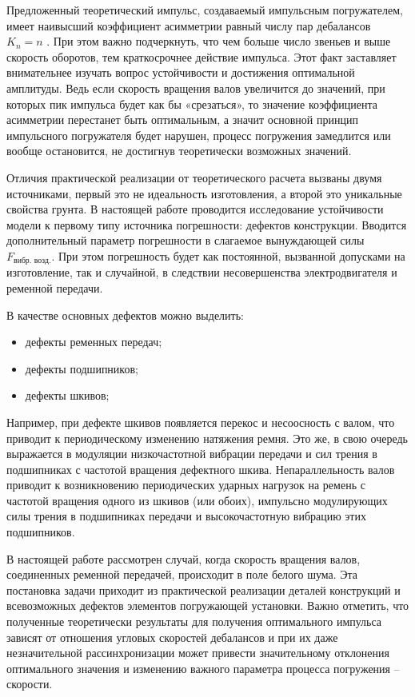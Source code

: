 Предложенный теоретический импульс, создаваемый импульсным погружателем, имеет наивысший
коэффициент асимметрии равный числу пар дебалансов $K_n=n$ \cite{kostin_va}. При этом важно подчеркнуть, что
чем больше число звеньев и выше скорость оборотов, тем краткосрочнее действие импульса. Этот факт заставляет
внимательнее изучать вопрос устойчивости и достижения оптимальной амплитуды. Ведь если скорость вращения валов
увеличится до значений, при которых пик импульса будет как бы «срезаться», то значение коэффициента асимметрии
перестанет быть оптимальным, а значит основной принцип импульсного погружателя будет нарушен, процесс погружения
замедлится или вообще остановится, не достигнув теоретически возможных значений.

Отличия практической реализации от теоретического расчета вызваны двумя источниками, первый это не идеальность изготовления,
а второй это уникальные свойства грунта. В настоящей работе проводится исследование устойчивости модели к первому типу
источника погрешности: дефектов конструкции. Вводится дополнительный параметр погрешности в слагаемое вынуждающей силы
$F_{\text{вибр. возд.}}$. При этом погрешность будет как постоянной, вызванной допусками на изготовление, так и случайной,
в следствии несовершенства электродвигателя и ременной передачи.

В качестве основных дефектов можно выделить:
\begin{itemize}
    \item дефекты ременных передач;
    \item дефекты подшипников;
    \item дефекты шкивов;
\end{itemize}
Например, при дефекте шкивов появляется перекос и несоосность с валом, что приводит к периодическому изменению натяжения ремня.
Это же, в свою очередь выражается в модуляции низкочастотной вибрации передачи и сил трения в подшипниках с частотой вращения дефектного шкива.
Непараллельность валов приводит к возникновению периодических ударных нагрузок на ремень с частотой вращения одного из шкивов (или обоих),
импульсно модулирующих силы трения в подшипниках передачи и высокочастотную вибрацию этих подшипников.

В настоящей работе рассмотрен случай, когда скорость вращения валов, соединенных ременной передачей, происходит в поле белого шума.
Эта постановка задачи приходит из практической реализации деталей конструкций и всевозможных дефектов элементов погружающей установки.
Важно отметить, что полученные теоретически результаты для получения оптимального импульса зависят от отношения угловых скоростей дебалансов
и при их даже незначительной рассинхронизации может привести значительному отклонения оптимального значения и изменению важного параметра
процесса погружения – скорости.

